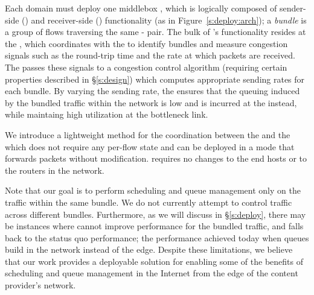 Each domain must deploy one middlebox , which is logically composed of sender-side (\inbox) and receiver-side (\outbox) functionality (as in Figure~\ref{s:deploy:arch});
a \emph{bundle} is a group of flows traversing the same \inbox{}-\outbox{} pair.
The bulk of \name's functionality resides at the \inbox, which coordinates with the \outbox to identify bundles and measure congestion signals such as the round-trip time and the rate at which packets are received.
The \inbox passes these signals to a congestion control algorithm (requiring certain properties described in \S\ref{s:design}) which computes appropriate sending rates for each bundle. 
By varying the sending rate, the \inbox ensures that the queuing induced by the bundled traffic within the network is low and is incurred at the \inbox instead, while maintaing high utilization at the bottleneck link.
 
We introduce a lightweight method for the coordination between the \inbox and the \outbox which does not require any per-flow state and can be deployed in a mode that forwards packets without modification. \name requires no changes to the end hosts or to the routers in the network.
 
Note that our goal is to perform scheduling and queue management only on the traffic within the same bundle. We do not currently attempt to control traffic across different bundles. 
Furthermore, as we will discuss in \S\ref{s:deploy}, there may be instances where \name cannot improve performance for the bundled traffic, and falls back to the status quo performance; \ie the performance achieved today when queues build in the network instead of the edge. 
Despite these limitations, we believe that our work provides a deployable solution for enabling some of the benefits of scheduling and queue management in the Internet from the edge of the content provider's network.
 
